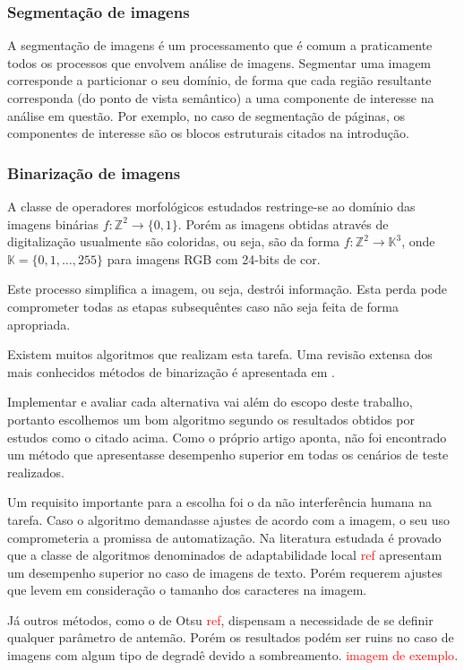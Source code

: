 \documentclass[a4paper,11pt]{article}
\newcommand{\TODO}[1]{\textcolor{red}{#1}}
\begin{document}
\subsubsection{Segmentação de imagens}
A segmentação de imagens é um processamento que é comum a praticamente
todos os processos que envolvem análise de imagens. Segmentar uma
imagem corresponde a particionar o seu domínio, de forma que cada
região resultante corresponda (do ponto de vista semântico) a uma
componente de interesse na análise em questão. Por exemplo, no caso de
segmentação de páginas, os componentes de interesse são os blocos
estruturais citados na introdução.

\subsubsection{Binarização de imagens}

A classe de operadores morfológicos estudados restringe-se ao domínio das imagens binárias $f: \mathbb{Z}^2 \to \{0,1\}$. Porém as imagens obtidas através de digitalização usualmente são coloridas, ou seja, são da forma $f: \mathbb{Z}^2 \to \mathbb{K}^3$, onde $\mathbb{K} = \{0, 1, \ldots, 255\}$ para imagens RGB com 24-bits de cor.

Este processo simplifica a imagem, ou seja, destrói informação. Esta perda pode comprometer todas as etapas subsequêntes caso não seja feita de forma apropriada.

Existem muitos algoritmos que realizam esta tarefa. Uma revisão extensa dos mais conhecidos métodos de binarização é apresentada em \cite{citeulike:890354}.

Implementar e avaliar cada alternativa vai além do escopo deste trabalho, portanto escolhemos um bom algoritmo segundo os resultados obtidos por estudos como o citado acima. Como o próprio artigo aponta, não foi encontrado um método que apresentasse desempenho superior em todas os cenários de teste realizados.

Um requisito importante para a escolha foi o da não interferência humana na tarefa. Caso o algoritmo demandasse ajustes de acordo com a imagem, o seu uso comprometeria a promissa de automatização. Na literatura estudada é provado que a classe de algoritmos denominados de adaptabilidade local \TODO{ref} apresentam um desempenho superior no caso de imagens de texto. Porém requerem ajustes que levem em consideração o tamanho dos caracteres na imagem.

Já outros métodos, como o de Otsu \TODO{ref}, dispensam a necessidade de se definir qualquer parâmetro de antemão. Porém os resultados podém ser ruins no caso de imagens com algum tipo de degradê devido a sombreamento. \TODO{imagem de exemplo}.
\end{document}
